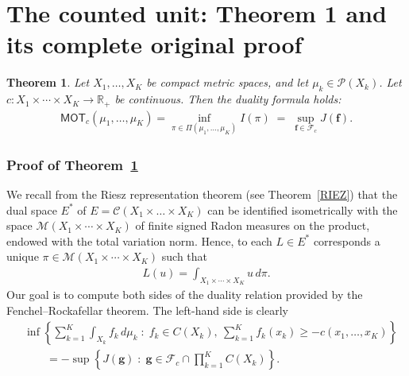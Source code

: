 \documentclass[10pt,a4paper]{amsart}
\theoremstyle{plain}
\newtheorem{theorem}{Theorem}
\theoremstyle{definition}
\theoremstyle{remark}
\begin{document}
\section{The counted unit: Theorem 1 and its complete original proof}

\begin{theorem}\label{KANTO}
Let $X_1,\ldots,X_K$ be compact metric spaces, and let $\mu_k\in\mathcal{P}(X_k)$.
Let $c : X_1 \times \cdots \times X_K \to \mathbb{R}_+$ be continuous. Then the duality formula holds:
\begin{align*}
\mathsf{MOT}_c(\mu_1,\ldots,\mu_K)
=\inf_{\pi\in\Pi(\mu_1,\dots,\mu_K)} I(\pi)
\;=\;
\sup_{\boldsymbol{f}\in \mathcal{F}_c} J(\boldsymbol{f}).
\end{align*}
\end{theorem}

\subsubsection*{Proof of Theorem~\ref{KANTO}}
We recall from the Riesz representation theorem (see Theorem~\ref{RIEZ}) that the dual space \(E^{\ast}\) of $E=\mathcal{C}(X_1\times\ldots\times X_K)$ can be
identified isometrically with the space 
\(\mathcal{M}(X_{1}\times\cdots\times X_{K})\) of finite
signed Radon measures on the product, endowed with the total variation norm. Hence, to each \(L\in E^{\ast}\) corresponds a unique
\(\pi\in \mathcal{M}(X_{1}\times\cdots\times X_{K})\) such that
\begin{align*}
L(u)=\int_{X_{1}\times\cdots\times X_{K}} u\, d\pi.
\end{align*}
Our goal is to compute both sides of the duality relation provided by the Fenchel--Rockafellar theorem. The left-hand side is clearly
\begin{align*}
&\inf\left\{
\sum_{k=1}^{K} \int_{X_k} f_k\,d\mu_k
\;:\;
f_k\in C(X_k),\ 
\sum_{k=1}^{K} f_k(x_k)\ge -c(x_1,\ldots,x_K)
\right\}
\\
&\qquad =
-\sup\left\{
J(\boldsymbol g)
\;:\;
\boldsymbol g\in \mathcal F_c\cap \prod_{k=1}^{K} C(X_k)
\right\}.
\end{align*}
\end{document}
